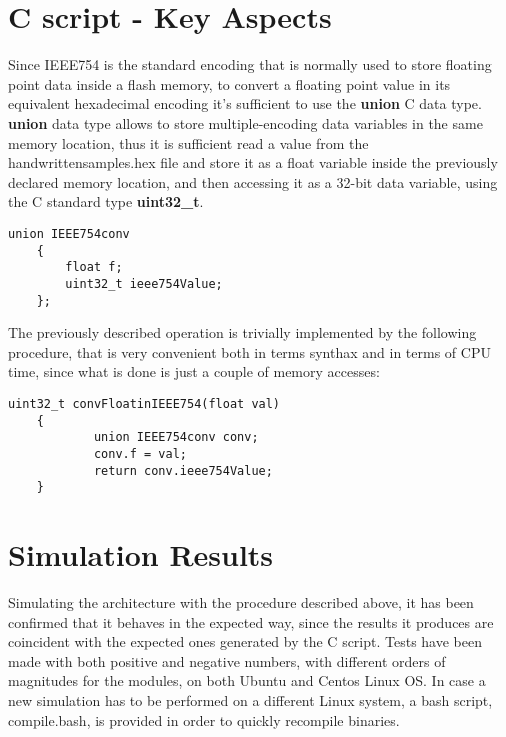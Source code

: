 \section{C script - Key Aspects}
Since IEEE754 is the standard encoding that is normally used to store floating point data inside a flash memory, to convert a floating point value in its equivalent hexadecimal 
encoding it's sufficient to use the   \textbf{union}  C data type.
\textbf{union} data type allows to store multiple-encoding data variables in the same memory location, thus it is sufficient read a value from the handwrittensamples.hex file 
and store it as a float variable inside the previously declared memory location, and then accessing it as a 32-bit data variable, using the C standard type \textbf{uint32\_t}.
\begin{lstlisting}[style=CStyle]
    union IEEE754conv 
    {
        float f;
        uint32_t ieee754Value;
    };

\end{lstlisting}

The previously described operation is trivially implemented by the following procedure, that is very convenient both in terms synthax and in terms of CPU time, since what is done is just a couple of memory accesses:
\begin{lstlisting}[style=CStyle]
    uint32_t convFloatinIEEE754(float val)
    {
            union IEEE754conv conv;
            conv.f = val;
            return conv.ieee754Value;
    }
\end{lstlisting}
\section{Simulation Results}
Simulating the architecture with the procedure described above, it has been confirmed that it behaves in the expected way, since the results it produces are coincident with
the expected ones generated by the C script.
Tests have been made with both positive and negative numbers, with different orders of magnitudes for the modules, on both Ubuntu and Centos Linux OS. In case a new simulation has to be performed on a different Linux system, a bash script, compile.bash, is provided in order to 
quickly recompile binaries.
